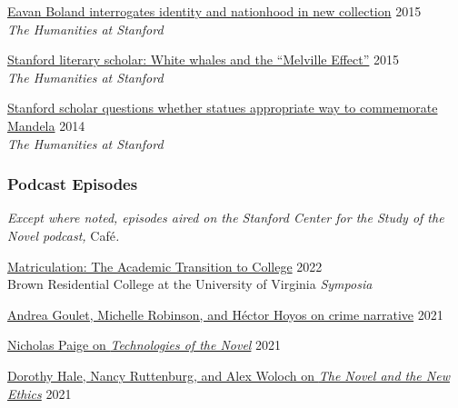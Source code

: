 \documentclass[
  12pt,
  letterpaper,
]{article}
\begin{document}
\href{https://web.archive.org/web/20210810123746/https://news.stanford.edu/news/2015/february/boland-country-book-022615.html}{Eavan
Boland interrogates identity and nationhood in new collection}
\hfill 2015\\
\hspace*{0.333em} \emph{The Humanities at Stanford}

\href{https://web.archive.org/web/20210810125202/https://news.stanford.edu/news/2015/may/melville-scholar-boone-051115.html}{Stanford
literary scholar: White whales and the ``Melville Effect''}
\hfill 2015\\
\hspace*{0.333em} \emph{The Humanities at Stanford}

\href{https://web.archive.org/web/20220611230152/https://news.stanford.edu/pr/2014/pr-mandela-statue-parker-120314.html}{Stanford
scholar questions whether statues appropriate way to commemorate
Mandela} \hfill 2014\\
\hspace*{0.333em} \emph{The Humanities at Stanford}

\hypertarget{podcast-episodes}{%
\subsubsection{Podcast Episodes}\label{podcast-episodes}}

\emph{Except where noted, episodes aired on the Stanford Center
for the Study of the Novel podcast, }Café\emph{.}

\href{https://virginiaaudio.org/\#/symposia/}{Matriculation: The
Academic Transition to College} \hfill 2022\\
\hspace*{0.333em} Brown Residential College at the University of
Virginia \emph{Symposia}

\href{https://web.archive.org/web/20220429010015/https://novel.stanford.edu/csn-cafe/2021/7/23/crime-narratives-with-andrea-goulet-michelle-robinson-and-hctor-hoyos-43021-je87a}{Andrea
Goulet, Michelle Robinson, and Héctor Hoyos on crime narrative}
\hfill 2021

\href{https://web.archive.org/web/20220429093420/https://novel.stanford.edu/csn-cafe/2021/7/23/nicholas-paige-technologies-of-the-novel-2821}{Nicholas
Paige on \emph{Technologies of the Novel}} \hfill 2021

\href{https://web.archive.org/web/20220429093353/https://novel.stanford.edu/csn-cafe/2021/7/23/books-at-the-center-dorothy-hale-the-novel-and-the-new-ethics-11521}{Dorothy
Hale, Nancy Ruttenburg, and Alex Woloch on \emph{The Novel and the New
Ethics}} \hfill 2021
\end{document}
